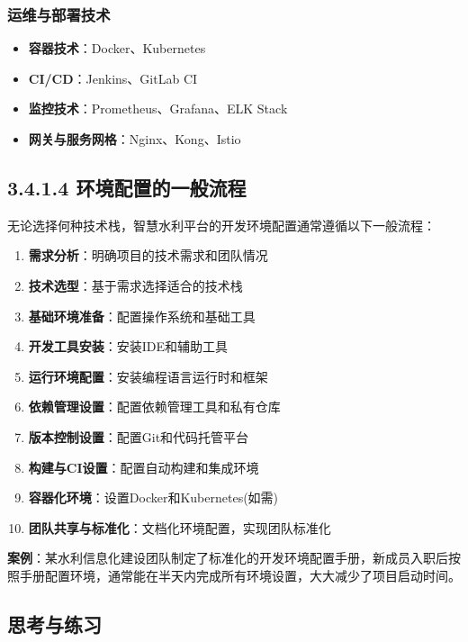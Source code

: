 \subsubsection{运维与部署技术}\label{ux8fd0ux7ef4ux4e0eux90e8ux7f72ux6280ux672f}

\begin{itemize}
\tightlist
\item
  \textbf{容器技术}：Docker、Kubernetes
\item
  \textbf{CI/CD}：Jenkins、GitLab CI
\item
  \textbf{监控技术}：Prometheus、Grafana、ELK Stack
\item
  \textbf{网关与服务网格}：Nginx、Kong、Istio
\end{itemize}

\subsection{3.4.1.4
环境配置的一般流程}\label{ux73afux5883ux914dux7f6eux7684ux4e00ux822cux6d41ux7a0b}

无论选择何种技术栈，智慧水利平台的开发环境配置通常遵循以下一般流程：

\begin{enumerate}
\def\labelenumi{\arabic{enumi}.}
\tightlist
\item
  \textbf{需求分析}：明确项目的技术需求和团队情况
\item
  \textbf{技术选型}：基于需求选择适合的技术栈
\item
  \textbf{基础环境准备}：配置操作系统和基础工具
\item
  \textbf{开发工具安装}：安装IDE和辅助工具
\item
  \textbf{运行环境配置}：安装编程语言运行时和框架
\item
  \textbf{依赖管理设置}：配置依赖管理工具和私有仓库
\item
  \textbf{版本控制设置}：配置Git和代码托管平台
\item
  \textbf{构建与CI设置}：配置自动构建和集成环境
\item
  \textbf{容器化环境}：设置Docker和Kubernetes(如需)
\item
  \textbf{团队共享与标准化}：文档化环境配置，实现团队标准化
\end{enumerate}

\textbf{案例}：某水利信息化建设团队制定了标准化的开发环境配置手册，新成员入职后按照手册配置环境，通常能在半天内完成所有环境设置，大大减少了项目启动时间。

\subsection{思考与练习}\label{ux601dux8003ux4e0eux7ec3ux4e60}

